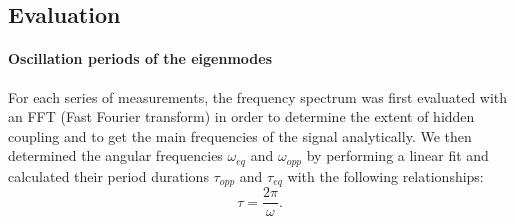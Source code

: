 \documentclass{article}
\begin{document}
\subsection{Evaluation}
\paragraph{Oscillation periods of the eigenmodes}
For each series of measurements, the frequency spectrum was first evaluated with an FFT (Fast Fourier transform) in order to determine the extent of hidden coupling and to get the main frequencies of the signal analytically.
We then determined the angular frequencies $\omega_{eq}$ and $\omega_{opp}$ by performing a linear fit and calculated their period durations $\tau_{opp}$ and $\tau_{eq}$ with the following relationships:
\begin{equation}
    \tau = \frac{2\pi}{\omega}.
\end{equation}
\end{document}
